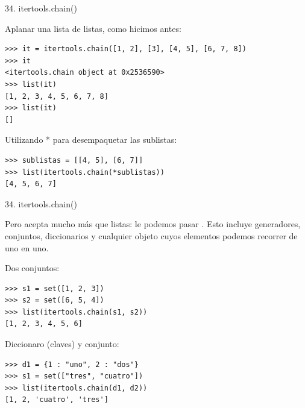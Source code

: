 \documentclass[14pt]{beamer}
\begin{document}
\begin{frame}[fragile]{34. itertools.chain()}
  \scriptsize
  \begin{exampleblock}
    {\footnotesize
      Aplanar una lista de listas, como hicimos antes:}
    \begin{lstlisting}
>>> it = itertools.chain([1, 2], [3], [4, 5], [6, 7, 8])
>>> it
<itertools.chain object at 0x2536590>
>>> list(it)
[1, 2, 3, 4, 5, 6, 7, 8]
>>> list(it)
[]
    \end{lstlisting}
  \end{exampleblock}

  \begin{exampleblock}
  {\footnotesize
    Utilizando * para desempaquetar las sublistas:}
    \begin{lstlisting}
>>> sublistas = [[4, 5], [6, 7]]
>>> list(itertools.chain(*sublistas))
[4, 5, 6, 7]
    \end{lstlisting}
  \end{exampleblock}
\end{frame}

\begin{frame}[fragile]{34. itertools.chain()}
  \small
  \begin{alertblock}{}
    \centering
    Pero  acepta mucho más que listas: le podemos pasar
    . Esto incluye
    generadores, conjuntos, diccionarios y cualquier objeto cuyos
    elementos podemos recorrer de uno en uno.
  \end{alertblock}

  \scriptsize
  \begin{exampleblock}
    {Dos conjuntos:}
    \begin{lstlisting}
>>> s1 = set([1, 2, 3])
>>> s2 = set([6, 5, 4])
>>> list(itertools.chain(s1, s2))
[1, 2, 3, 4, 5, 6]
    \end{lstlisting}
  \end{exampleblock}

  \begin{exampleblock}
    {Diccionaro (claves) y conjunto:}
    \begin{lstlisting}
>>> d1 = {1 : "uno", 2 : "dos"}
>>> s1 = set(["tres", "cuatro"])
>>> list(itertools.chain(d1, d2))
[1, 2, 'cuatro', 'tres']
    \end{lstlisting}
  \end{exampleblock}
\end{frame}
\end{document}
